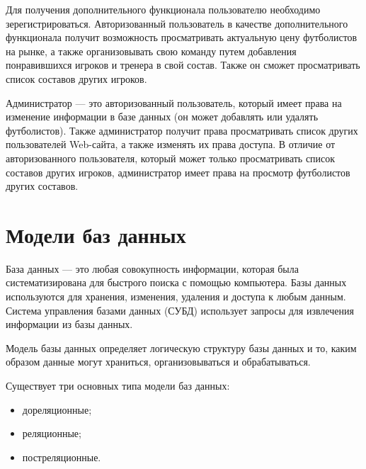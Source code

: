 
Для получения дополнительного функционала пользователю необходимо зерегистрироваться. Авторизованный пользователь в качестве дополнительного функционала получит возможность просматривать актуальную цену футболистов на рынке, а также организовывать свою команду путем добавления понравившихся игроков и тренера в свой состав. Также он сможет просматривать список составов других игроков.


\clearpage

Администратор --- это авторизованный пользователь, который имеет права на изменение информации в базе данных (он может добавлять или удалять футболистов). Также администратор получит права просматривать список других пользователей Web-сайта, а также изменять их права доступа. В отличие от авторизованного пользователя, который может только просматривать список составов других игроков, администратор имеет права на просмотр футболистов других составов.


\clearpage

\section{Модели баз данных}


База данных --- это любая совокупность информации, которая была систематизирована для быстрого поиска с помощью компьютера. Базы данных используются для хранения, изменения, удаления и доступа к любым данным. Система управления базами данных (СУБД) использует запросы для извлечения информации из базы данных.

Модель базы данных определяет логическую структуру базы данных и то, каким образом данные могут храниться, организовываться и обрабатываться.


Существует три основных типа модели баз данных:

\begin{itemize}
    \item дореляционные;
    \item реляционные;
    \item постреляционные.
\end{itemize}

